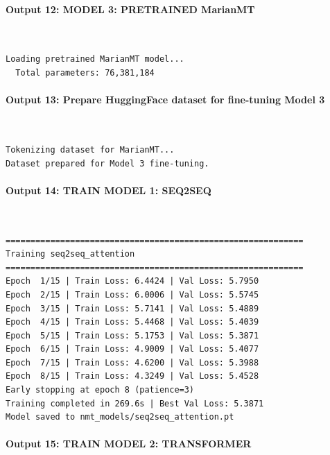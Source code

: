 \documentclass[12pt,a4paper,oneside]{report}
\begin{document}
\paragraph{Output 12: MODEL 3: PRETRAINED MarianMT}\mbox{}\\[-1ex]
\begin{Verbatim}[commandchars=\\\{\},breaklines=true,breakanywhere=true,fontsize=\scriptsize,frame=leftline,framesep=2mm,rulecolor=\color{gray}]
Loading pretrained MarianMT model...
  Total parameters: 76,381,184
\end{Verbatim}
\paragraph{Output 13: Prepare HuggingFace dataset for fine-tuning Model 3}\mbox{}\\[-1ex]
\begin{Verbatim}[commandchars=\\\{\},breaklines=true,breakanywhere=true,fontsize=\scriptsize,frame=leftline,framesep=2mm,rulecolor=\color{gray}]
Tokenizing dataset for MarianMT...
Dataset prepared for Model 3 fine-tuning.
\end{Verbatim}
\paragraph{Output 14: TRAIN MODEL 1: SEQ2SEQ}\mbox{}\\[-1ex]
\begin{Verbatim}[commandchars=\\\{\},breaklines=true,breakanywhere=true,fontsize=\scriptsize,frame=leftline,framesep=2mm,rulecolor=\color{gray}]
============================================================
Training seq2seq_attention
============================================================
Epoch  1/15 | Train Loss: 6.4424 | Val Loss: 5.7950
Epoch  2/15 | Train Loss: 6.0006 | Val Loss: 5.5745
Epoch  3/15 | Train Loss: 5.7141 | Val Loss: 5.4889
Epoch  4/15 | Train Loss: 5.4468 | Val Loss: 5.4039
Epoch  5/15 | Train Loss: 5.1753 | Val Loss: 5.3871
Epoch  6/15 | Train Loss: 4.9009 | Val Loss: 5.4077
Epoch  7/15 | Train Loss: 4.6200 | Val Loss: 5.3988
Epoch  8/15 | Train Loss: 4.3249 | Val Loss: 5.4528
Early stopping at epoch 8 (patience=3)
Training completed in 269.6s | Best Val Loss: 5.3871
Model saved to nmt_models/seq2seq_attention.pt
\end{Verbatim}
\paragraph{Output 15: TRAIN MODEL 2: TRANSFORMER}\mbox{}\\[-1ex]
\end{document}
